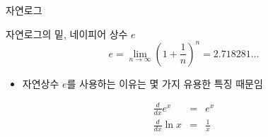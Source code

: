 \documentclass[10pt,t]{beamer}
\begin{document}
\begin{frame}[fragile]{자연로그}
\begin{block}{자연로그의 밑, 네이피어 상수 $e$}
    \begin{equation*}
        e=\lim_{n\rightarrow\infty} \left(1+ \frac{1}{n}\right)^n = 2.718281\ldots
    \end{equation*}
    \begin{itemize}
        \item 자연상수 $e$를 사용하는 이유는 몇 가지 유용한 특징 때문임
    \end{itemize}
    \begin{eqnarray*}
        \frac{d}{dx}e^x & = & e^x\\
        \frac{d}{dx}\ln x &= &\frac{1}{x}
    \end{eqnarray*}
\end{block}
\end{frame}
\end{document}
